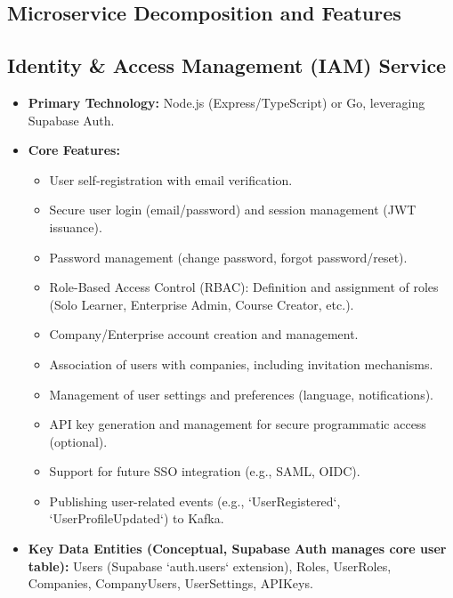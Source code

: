 \documentclass[12pt, a4paper]{report} %
\begin{document}
\begin{itemize}
\chapter{Microservice Decomposition and Features}
  \section{Identity \& Access Management (IAM) Service}
    \begin{itemize}
        \item \textbf{Primary Technology:} Node.js (Express/TypeScript) or Go, leveraging Supabase Auth.
        \item \textbf{Core Features:}
            \begin{itemize}
                \item User self-registration with email verification.
                \item Secure user login (email/password) and session management (JWT issuance).
                \item Password management (change password, forgot password/reset).
                \item Role-Based Access Control (RBAC): Definition and assignment of roles (Solo Learner, Enterprise Admin, Course Creator, etc.).
                \item Company/Enterprise account creation and management.
                \item Association of users with companies, including invitation mechanisms.
                \item Management of user settings and preferences (language, notifications).
                \item API key generation and management for secure programmatic access (optional).
                \item Support for future SSO integration (e.g., SAML, OIDC).
                \item Publishing user-related events (e.g., `UserRegistered`, `UserProfileUpdated`) to Kafka.
            \end{itemize}
        \item \textbf{Key Data Entities (Conceptual, Supabase Auth manages core user table):} Users (Supabase `auth.users` extension), Roles, UserRoles, Companies, CompanyUsers, UserSettings, APIKeys.
    \end{itemize}

\end{itemize}
\end{document}
